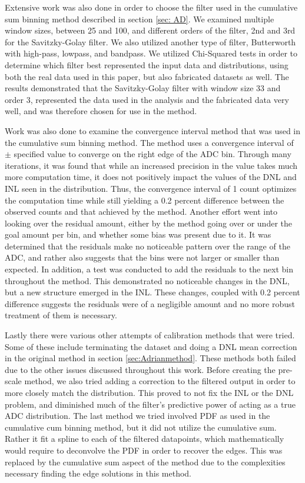 \documentclass[11pt, letterpaper]{article}
\begin{document}
Extensive work was also done in order to choose the filter used in the cumulative sum binning method described in section \ref{sec: AD}. 
We examined multiple window sizes, between 25 and 100, and different orders of the filter, 2nd and 3rd for the Savitzky-Golay filter. 
We also utilized another type of filter, Butterworth with high-pass, lowpass, and bandpass. 
We utilized Chi-Squared tests in order to determine which filter best represented the input data and distributions, using both the real data used in this paper, but also fabricated datasets as well. 
The results demonstrated that the Savitzky-Golay filter with window size 33 and order 3, represented the data used in the analysis and the fabricated data very well, and was therefore chosen for use in the method. 
 \indent 

Work was also done to examine the convergence interval method that was used in the cumulative sum binning method. 
The method uses a convergence interval of $\pm$ specified value to converge on the right edge of the ADC bin. 
Through many iterations, it was found that while an increased precision in the value takes much more computation time, it does not positively impact the values of the DNL and INL seen in the distribution. 
Thus, the convergence interval of 1 count optimizes the computation time while still yielding a 0.2 percent difference between the observed counts and that achieved by the method. 
Another effort went into looking over the residual amount, either by the method going over or under the goal amount per bin, and whether some bias was present due to it. 
It was determined that the residuals make no noticeable pattern over the range of the ADC, and rather also suggests that the bins were not larger or smaller than expected. 
In addition, a test was conducted to add the residuals to the next bin throughout the method. 
This demonstrated no noticeable changes in the DNL, but a new structure emerged in the INL. 
These changes, coupled with 0.2 percent difference suggests the residuals were of a negligible amount and no more robust treatment of them is necessary. 
\indent 


Lastly there were various other attempts of calibration methods that were tried. 
Some of these include terminating the dataset and doing a DNL mean correction in the original method in section \ref{sec:Adrianmethod}. 
These methods both failed due to the other issues discussed throughout this work. 
Before creating the pre-scale method, we also tried adding a correction to the filtered output in order to more closely match the distribution. 
This proved to not fix the INL or the DNL problem, and diminished much of the filter's predictive power of acting as a true ADC distribution.
The last method we tried involved PDF as used in the cumulative cum binning method, but it did not utilize the cumulative sum. 
Rather it fit a spline to each of the filtered datapoints, which mathematically would require to deconvolve the PDF in order to recover the edges. 
This was replaced by the cumulative sum aspect of the method due to the complexities necessary finding the edge solutions in this method. 
\end{document}
